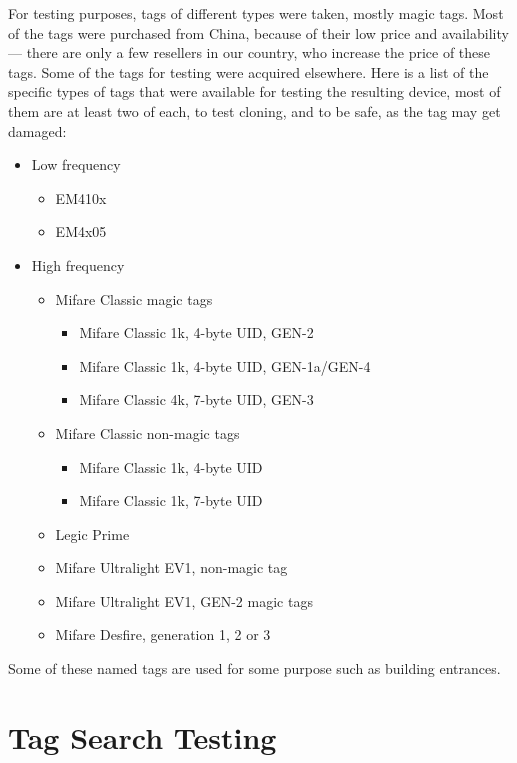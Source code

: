 For testing purposes, tags of different types were taken, mostly magic tags. Most of the tags were purchased from China, because of their low price and availability --- there are only a few resellers in our country, who increase the price of these tags. Some of the tags for testing were acquired elsewhere. Here is a list of the specific types of tags that were available for testing the resulting device, most of them are at least two of each, to test cloning, and to be safe, as the tag may get damaged:
\begin{itemize}
    \item Low frequency
    \begin{itemize}
        \item EM410x
        \item EM4x05
    \end{itemize}
    \item High frequency
    \begin{itemize}
        \item Mifare Classic magic tags
        \begin{itemize}
            \item Mifare Classic 1k, 4-byte UID, GEN-2
            \item Mifare Classic 1k, 4-byte UID, GEN-1a/GEN-4
            \item Mifare Classic 4k, 7-byte UID, GEN-3
        \end{itemize}
        \item Mifare Classic non-magic tags
        \begin{itemize}
            \item Mifare Classic 1k, 4-byte UID
            \item Mifare Classic 1k, 7-byte UID
        \end{itemize}
        \item Legic Prime
        \item Mifare Ultralight EV1, non-magic tag
        \item Mifare Ultralight EV1, GEN-2 magic tags
        \item Mifare Desfire, generation 1, 2 or 3
    \end{itemize}
\end{itemize}
Some of these named tags are used for some purpose such as building entrances.

\section{Tag Search Testing}

